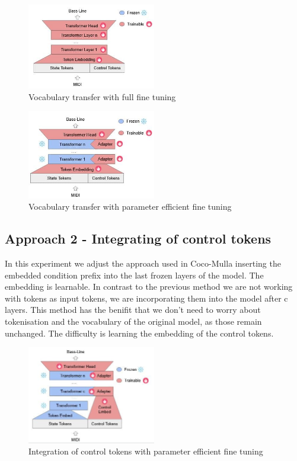 \begin{figure}[H]
    \centering
    \includegraphics[width=0.5\textwidth]{IMAGES/full_ft.jpg}
    \caption{Vocabulary transfer with full  fine tuning}
    \label{fig:vocabtrans1}
\end{figure}

\begin{figure}[H]
    \centering
    \includegraphics[width=0.5\textwidth]{IMAGES/vocab_lora_ft.jpg} 
    \caption{Vocabulary transfer with parameter efficient fine tuning}
    \label{fig:vocabtrans2}
\end{figure}

\subsection{Approach 2 - Integrating of control tokens} 

In this experiment we adjust the approach used in Coco-Mulla \cite{Lin_cocomulla_2024} inserting the embedded condition prefix into the last frozen layers of the model. The embedding is learnable. In contrast to the previous method we are not working with tokens as input tokens, we are incorporating them into the model after c layers. This method has the benifit that we don't need to worry about tokenisation and the vocabulary of the original model, as those remain unchanged. The difficulty is learning the embedding of the control tokens.
 
\begin{figure}[H]
    \centering
    \includegraphics[width=0.5\textwidth]{IMAGES/ControlTokensLora.jpg} 
    \caption{Integration of control tokens with parameter efficient fine tuning}
    \label{fig:controltok}
\end{figure}

